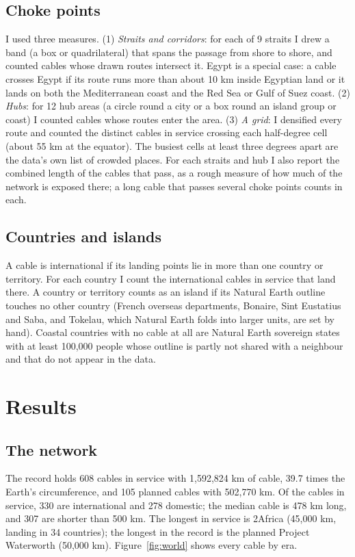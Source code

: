 \documentclass[11pt,a4paper]{article}
\begin{document}
\subsection{Choke points}
I used three measures. (1) \emph{Straits and corridors}: for each of 9 straits I drew a band (a box or quadrilateral) that spans the passage from shore to shore, and counted cables whose drawn routes intersect it. Egypt is a special case: a cable crosses Egypt if its route runs more than about 10 km inside Egyptian land or it lands on both the Mediterranean coast and the Red Sea or Gulf of Suez coast. (2) \emph{Hubs}: for 12 hub areas (a circle round a city or a box round an island group or coast) I counted cables whose routes enter the area. (3) \emph{A grid}: I densified every route and counted the distinct cables in service crossing each half-degree cell (about 55 km at the equator). The busiest cells at least three degrees apart are the data's own list of crowded places. For each straits and hub I also report the combined length of the cables that pass, as a rough measure of how much of the network is exposed there; a long cable that passes several choke points counts in each.

\subsection{Countries and islands}
A cable is international if its landing points lie in more than one country or territory. For each country I count the international cables in service that land there. A country or territory counts as an island if its Natural Earth outline touches no other country (French overseas departments, Bonaire, Sint Eustatius and Saba, and Tokelau, which Natural Earth folds into larger units, are set by hand). Coastal countries with no cable at all are Natural Earth sovereign states with at least 100,000 people whose outline is partly not shared with a neighbour and that do not appear in the data.

\section{Results}
\subsection{The network}
The record holds 608 cables in service with 1,592,824 km of cable, 39.7 times the Earth's circumference, and 105 planned cables with 502,770 km. Of the cables in service, 330 are international and 278 domestic; the median cable is 478 km long, and 307 are shorter than 500 km. The longest in service is 2Africa (45,000 km, landing in 34 countries); the longest in the record is the planned Project Waterworth (50,000 km). Figure~\ref{fig:world} shows every cable by era.
\end{document}
